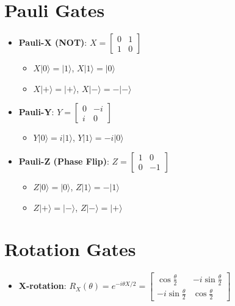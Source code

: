 \begin{multicols}{3}
\section*{Pauli Gates}
\begin{itemize}[leftmargin=*,nosep,topsep=0pt]
    \item \textbf{Pauli-X (NOT)}: $X = \begin{bmatrix} 0 & 1 \\ 1 & 0 \end{bmatrix}$
        \begin{itemize}[nosep]
            \item $X|0\rangle = |1\rangle$, $X|1\rangle = |0\rangle$
            \item $X|+\rangle = |+\rangle$, $X|-\rangle = -|-\rangle$
        \end{itemize}

    \item \textbf{Pauli-Y}: $Y = \begin{bmatrix} 0 & -i \\ i & 0 \end{bmatrix}$
        \begin{itemize}[nosep]
            \item $Y|0\rangle = i|1\rangle$, $Y|1\rangle = -i|0\rangle$
        \end{itemize}

    \item \textbf{Pauli-Z (Phase Flip)}: $Z = \begin{bmatrix} 1 & 0 \\ 0 & -1 \end{bmatrix}$
        \begin{itemize}[nosep]
            \item $Z|0\rangle = |0\rangle$, $Z|1\rangle = -|1\rangle$
            \item $Z|+\rangle = |-\rangle$, $Z|-\rangle = |+\rangle$
        \end{itemize}
\end{itemize}

\section*{Rotation Gates}
\begin{itemize}[leftmargin=*,nosep,topsep=0pt]
    \item \textbf{X-rotation}: $R_X(\theta) = e^{-i\theta X/2} = \begin{bmatrix} \cos\frac{\theta}{2} & -i\sin\frac{\theta}{2} \\ -i\sin\frac{\theta}{2} & \cos\frac{\theta}{2} \end{bmatrix}$


\end{itemize}
\end{multicols}
